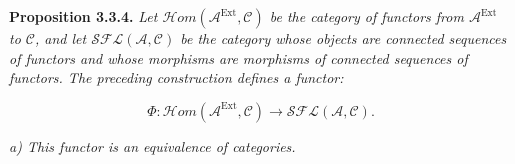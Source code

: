 \medskip\noindent\textbf{Proposition 3.3.4.}\quad
\textit{Let
$\mathcal H\!om(\mathcal A^{\operatorname{Ext}},\mathcal C)$ be the
category of functors from $\mathcal A^{\operatorname{Ext}}$ to
$\mathcal C$, and let $\mathcal{SFL}(\mathcal A,\mathcal C)$ be the category
whose objects are connected sequences of functors and whose morphisms are
morphisms of connected sequences of functors. The preceding construction
defines a functor:}

\[
\Phi\colon
\mathcal H\!om(\mathcal A^{\operatorname{Ext}},\mathcal C)
\longrightarrow\mathcal{SFL}(\mathcal A,\mathcal C).
\]

\noindent\textit{a) This functor is an equivalence of categories.}
\endgroup

